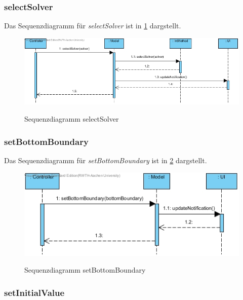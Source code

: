 \subsubsection*{selectSolver}

Das Sequenzdiagramm für \emph{selectSolver} ist in \ref{Sequenzdiagramm selectSolver} dargstellt.

\begin{figure}[H]
	\centering
	\includegraphics[scale=.6]{Bilder/Model__selectSolver().jpg}\\
	\caption{Sequenzdiagramm selectSolver}
	\label{Sequenzdiagramm selectSolver}
\end{figure}

\subsubsection*{setBottomBoundary}

Das Sequenzdiagramm für \emph{setBottomBoundary} ist in \ref{Sequenzdiagramm setBottomBoundary} dargstellt.

\begin{figure}[H]
	\centering
	\includegraphics[scale=.6]{Bilder/Model__setBottomBoundary().jpg}\\
	\caption{Sequenzdiagramm setBottomBoundary}
	\label{Sequenzdiagramm setBottomBoundary}
\end{figure}

\subsubsection*{setInitialValue}

